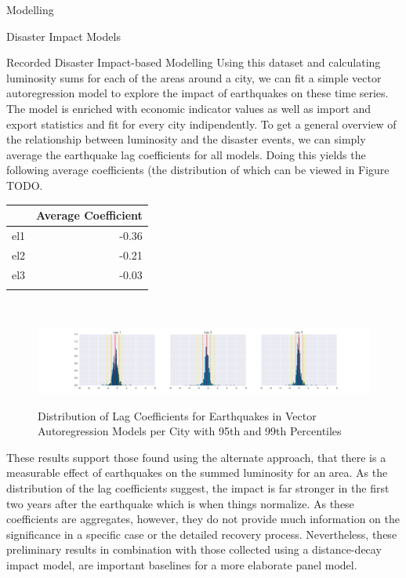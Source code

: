 \documentclass[12pt,fleqn,leqno,letterpaper]{article}
\begin{document}
\begin{section}{Modelling}
\begin{subsection}{Disaster Impact Models}
\begin{subsubsection}{Recorded Disaster Impact-based Modelling}
      Using this dataset and calculating luminosity sums for each of the areas around a city, we can fit a simple vector autoregression model to explore the impact of earthquakes on these time series. The model is enriched with economic indicator values as well as import and export statistics and fit for every city indipendently. To get a general overview of the relationship between luminosity and the disaster events, we can simply average the earthquake lag coefficients for all models. Doing this yields the following average coefficients (the distribution of which can be viewed in Figure TODO.\\
      \begin{center}
        \begin{tabular}{lr}\\
          \toprule
          {} & Average Coefficient \\
          \midrule
          el1 & -0.36 \\
          el2 & -0.21 \\
          el3 & -0.03 \\
          \bottomrule\\
        \end{tabular}\\
      \end{center}
      \begin{figure}
        \centering
        \includegraphics[width=\linewidth]{non_balanced_earthquake_coefficients_distribution}\label{fig:non_balanced_earthquake_coefficients_distribution} %
        \caption{Distribution of Lag Coefficients for Earthquakes in Vector Autoregression Models per City with 95th and 99th Percentiles}
      \end{figure}
      These results support those found using the alternate approach, that there is a measurable effect of earthquakes on the summed luminosity for an area. As the distribution of the lag coefficients suggest, the impact is far stronger in the first two years after the earthquake which is when things normalize. As these coefficients are aggregates, however, they do not provide much information on the significance in a specific case or the detailed recovery process. Nevertheless, these preliminary results in combination with those collected using a distance-decay impact model, are important baselines for a more elaborate panel model.\\

\end{subsubsection}
\end{subsection}
\end{section}
\end{document}
